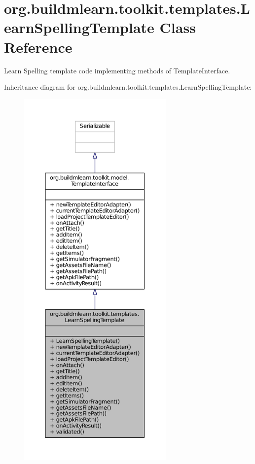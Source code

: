 \hypertarget{classorg_1_1buildmlearn_1_1toolkit_1_1templates_1_1LearnSpellingTemplate}{\section{org.\-buildmlearn.\-toolkit.\-templates.\-Learn\-Spelling\-Template Class Reference}
\label{classorg_1_1buildmlearn_1_1toolkit_1_1templates_1_1LearnSpellingTemplate}
}


Learn Spelling template code implementing methods of Template\-Interface.  




Inheritance diagram for org.\-buildmlearn.\-toolkit.\-templates.\-Learn\-Spelling\-Template\-:
\nopagebreak
\begin{figure}[H]
\begin{center}
\leavevmode
\includegraphics[height=550pt]{d1/da1/classorg_1_1buildmlearn_1_1toolkit_1_1templates_1_1LearnSpellingTemplate__inherit__graph}
\end{center}
\end{figure}


